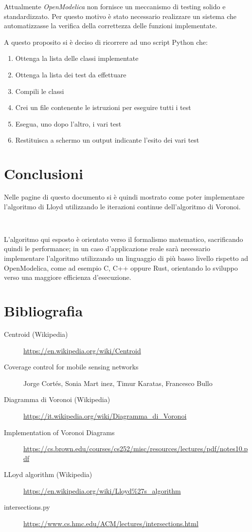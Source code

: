 \documentclass[11pt,a4paper]{report}
\begin{document}
Attualmente \textit{OpenModelica} non fornisce un meccanismo di testing solido e standardizzato. Per questo motivo è stato necessario realizzare un sistema che automatizzasse la verifica della correttezza delle funzioni implementate.

A questo proposito si è deciso di ricorrere ad uno script Python che:

\begin{enumerate}
	\item Ottenga la lista delle classi implementate
	\item Ottenga la lista dei test da effettuare
	\item Compili le classi
	\item Crei un file contenente le istruzioni per eseguire tutti i test
	\item Esegua, uno dopo l'altro, i vari test
	\item Restituisca a schermo un output indicante l'esito dei vari test
\end{enumerate}



\chapter{Conclusioni}

Nelle pagine di questo documento si è quindi mostrato come poter implementare l'algoritmo di Lloyd utilizzando le iterazioni continue dell'algoritmo di Voronoi.

\

L'algoritmo qui esposto è orientato verso il formalismo matematico, sacrificando quindi le performance; in un caso d'applicazione reale sarà necessario implementare l'algoritmo utilizzando un linguaggio di più basso livello rispetto ad OpenModelica, come ad esempio C, C++ oppure Rust, orientando lo sviluppo verso una maggiore efficienza d'esecuzione.

\chapter*{Bibliografia}

\begin{description}
	\item[Centroid (Wikipedia)] \url{https://en.wikipedia.org/wiki/Centroid}
	\item[Coverage control for mobile sensing networks] Jorge Cortés, Sonia Mart inez, Timur Karatas, Francesco Bullo
	\item[Diagramma di Voronoi (Wikipedia)] \url{https://it.wikipedia.org/wiki/Diagramma_di_Voronoi}
	\item[Implementation of Voronoi Diagrams] \url{https://cs.brown.edu/courses/cs252/misc/resources/lectures/pdf/notes10.pdf}
	\item[LLoyd algorithm (Wikipedia)] \url{https://en.wikipedia.org/wiki/Lloyd%27s_algorithm}
	\item[intersections.py] \url{https://www.cs.hmc.edu/ACM/lectures/intersections.html}
\end{description}
\end{document}
